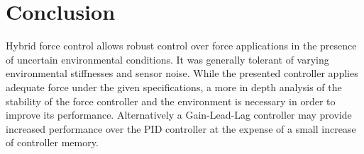 \documentclass[letterpaper,12pt]{report}
\begin{document}
\chapter{Conclusion}
Hybrid force control allows robust control over force applications in the presence of uncertain environmental conditions. It was generally tolerant of
varying environmental stiffnesses and sensor noise.
While the presented controller applies adequate force under the given specifications, a more in depth analysis of the stability of the 
force controller and the environment is necessary in order to improve its performance. 
Alternatively a Gain-Lead-Lag controller may provide increased performance over the PID controller at the expense of a small increase of controller memory.
\end{document}
